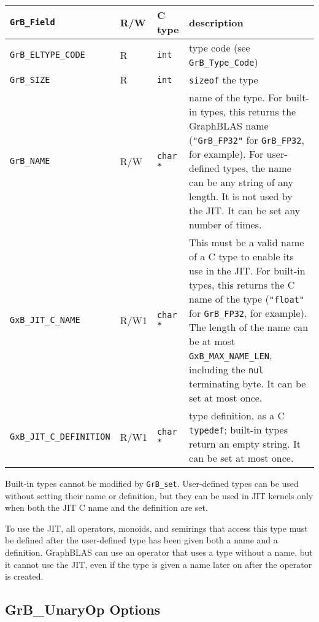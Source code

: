 \noindent
{\small
\begin{tabular}{|l|l|l|p{2.85in}|}
\hline
\verb'GrB_Field'                    & R/W  & C type        & description \\
\hline
\verb'GrB_ELTYPE_CODE'              & R    & \verb'int'    & type code (see \verb'GrB_Type_Code') \\
\verb'GrB_SIZE'                     & R    & \verb'int'    & \verb'sizeof' the type \\
\hline
\verb'GrB_NAME'                     & R/W  & \verb'char *' &
    name of the type.  For built-in types, this returns the GraphBLAS
    name (\verb'"GrB_FP32"' for \verb'GrB_FP32', for example).
    For user-defined types, the name can be any string of any length.  It is
    not used by the JIT.  It can be set any number of times. \\
\verb'GxB_JIT_C_NAME'               & R/W1 & \verb'char *' & 
    This must be a valid name of a C type to enable its use in the JIT.  For
    built-in types, this returns the C name of the type (\verb'"float"' for
    \verb'GrB_FP32', for example). The length of the name can be at most
    \verb'GxB_MAX_NAME_LEN', including the \verb'nul' terminating byte.  It can
    be set at most once. \\
\verb'GxB_JIT_C_DEFINITION'               & R/W1 & \verb'char *' &
    type definition, as a C \verb'typedef';
    built-in types return an empty string. 
    It can be set at most once. \\
\hline
\end{tabular}
}

Built-in types cannot be modified by \verb'GrB_set'.  User-defined types can be
used without setting their name or definition, but they can be used in JIT
kernels only when both the JIT C name and the definition are set.

To use the JIT, all operators, monoids, and semirings that access this type
must be defined after the user-defined type has been given both a name and a
definition.  GraphBLAS can use an operator that uses a type without a name,
but it cannot use the JIT, even if the type is given a name later on after
the operator is created.

\newpage
\subsection{{\sf GrB\_UnaryOp} Options}
\label{get_set_unop}

